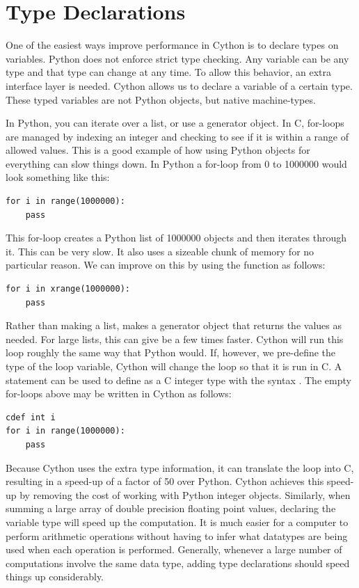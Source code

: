 \section*{Type Declarations}
One of the easiest ways improve performance in Cython is to declare types on variables.
Python does not enforce strict type checking.
Any variable can be any type and that type can change at any time.
To allow this behavior, an extra interface layer is needed.
Cython allows us to declare a variable of a certain type.
These typed variables are not Python objects, but native machine-types.

In Python, you can iterate over a list, or use a generator object.
In C, for-loops are managed by indexing an integer and checking to see if it is within a range of allowed values.
This is a good example of how using Python objects for everything can slow things down.
In Python a for-loop from 0 to 1000000 would look something like this:
\begin{lstlisting}
for i in range(1000000):
    pass
\end{lstlisting}
This for-loop creates a Python list of 1000000 objects and then iterates through it.
This can  be very slow.
It also uses a sizeable chunk of memory for no particular reason.
We can improve on this by using the  function as follows:
\begin{lstlisting}
for i in xrange(1000000):
    pass
\end{lstlisting}

Rather than making a list,  makes a generator object that returns the values as needed.
For large lists, this can give be a few times faster.
Cython will run this loop roughly the same way that Python would.
If, however, we pre-define the type of the loop variable, Cython will change the loop so that it is run in C.
A  statement can be used to define  as a C integer type with the syntax .
The empty for-loops above may be written in Cython as follows:
\begin{lstlisting}
cdef int i
for i in range(1000000):
    pass
\end{lstlisting}

Because Cython uses the extra type information, it can translate the loop into C, resulting in a speed-up of a factor of 50 over Python.
Cython achieves this speed-up by removing the cost of working with Python integer objects.
Similarly, when summing a large array of double precision floating point values, declaring the variable type will speed up the computation.
It is much easier for a computer to perform arithmetic operations without having to infer what datatypes are being used when each operation is performed.
Generally, whenever a large number of computations involve the same data type, adding type declarations should speed things up considerably.

